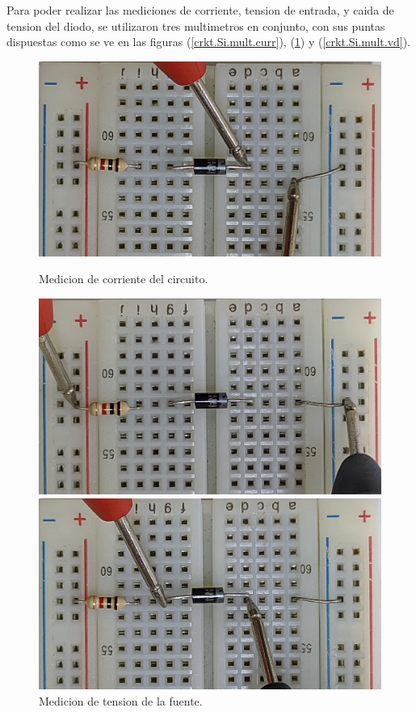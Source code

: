 \documentclass[chaptersright]{informeutn}
\begin{document}
      Para poder realizar las mediciones de corriente, tension de entrada, y caida de tension del diodo, se utilizaron
      tres multimetros en conjunto, con sus puntas dispuestas como se ve en las figuras (\ref{crkt.Si.mult.curr}),
      (\ref{crkt.Si.mult.vi}) y (\ref{crkt.Si.mult.vd}).
      \begin{figure}[H]
        \centering
        \begin{minipage}{0.3\textwidth}
          \includegraphics[angle=180, width=1\textwidth]{pictures/prot_crkt-1_curr.jpg}
          \caption{Medicion de corriente del circuito.}
          \label{crkt.Si.mult.curr}
        \end{minipage}
        \begin{minipage}{0.3\textwidth}
          \includegraphics[angle=180, width=1\textwidth]{pictures/prot_crkt-1_vi.jpg}
          \caption{Medicion de tension de la fuente.}
          \label{crkt.Si.mult.vi}
        \end{minipage}
        \begin{minipage}{0.3\textwidth}
          \includegraphics[angle=180, width=1\textwidth]{pictures/prot_crkt-1_vd.jpg}

\end{minipage}
\end{figure}
\end{document}
